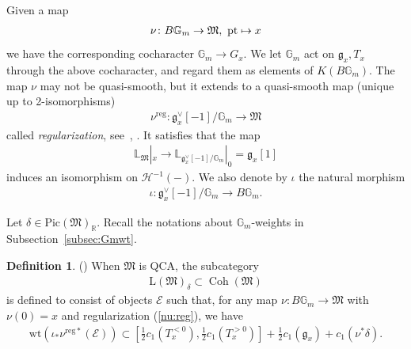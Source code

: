 \documentclass[11pt,oneside,a4paper,mathscr]{amsart}
\theoremstyle{definition}
\newtheorem{defn}[thm]{Definition}
\newcommand{\cH}{\mathcal{H}}
\newcommand{\cE}{\mathcal{E}}
\newcommand{\bgm}{B\mathbb{G}_m}
\newcommand{\Coh}{\operatorname{Coh}}
\newcommand{\wt}{\mathrm{wt}}
\begin{document}
Given a map 
\begin{align}\notag\nu \colon \bgm\to \mathfrak{M}, \ 
\mathrm{pt} \mapsto x
\end{align}
we have the corresponding cocharacter 
$\mathbb{G}_m \to G_x$. 
We let $\mathbb{G}_m$ act on $\mathfrak{g}_x, T_x$
through the above cocharacter, and regard them as elements of $K(\bgm)$. 
The map $\nu$ may not be quasi-smooth, but it extends to a quasi-smooth map
(unique up to 2-isomorphisms)
\begin{align}\label{nu:reg}
\nu^{\mathrm{reg}} \colon \mathfrak{g}_x^{\vee}[-1]/\mathbb{G}_m \to \mathfrak{M}
\end{align}
called \textit{regularization}, see~\cite[Construction~3.2.2]{HalpK32}, 
\cite[Construction-Definition~3.1]{PTlim}.
It satisfies that the map 
\begin{align*}
    \mathbb{L}_{\mathfrak{M}}|_{x} \to 
    \mathbb{L}_{\mathfrak{g}_x^{\vee}[-1]/\mathbb{G}_m}|_{0}=\mathfrak{g}_x[1]
\end{align*}
induces an isomorphism on $\cH^{-1}(-)$. 
We also denote by $\iota$ the natural 
morphism 
\begin{align*}
    \iota \colon \mathfrak{g}_x^{\vee}[-1]/\mathbb{G}_m \to 
    \bgm.
\end{align*}

Let $\delta \in \mathrm{Pic}(\mathfrak{M})_{\mathbb{R}}$. 
Recall the notations about $\mathbb{G}_m$-weights in Subsection~\ref{subsec:Gmwt}.
\begin{defn}\label{def:Lcat}(\cite[Definition~3.3]{PTlim})
When $\mathfrak{M}$ is QCA, the subcategory 
\begin{align}\label{def:L}
    \mathrm{L}(\mathfrak{M})_{\delta} \subset \Coh(\mathfrak{M})
\end{align}
is defined to consist of objects $\cE$ 
such that, for any map
$\nu \colon \bgm \to \mathfrak{M}$ 
with $\nu(0)=x$ and regularization (\ref{nu:reg}),
we have 
\begin{align}\label{wt:nu}
\wt(\iota_{\ast}\nu^{\mathrm{reg}\ast}(\cE))
\subset \left[\frac{1}{2} c_1 (T_x^{<0}),
\frac{1}{2} c_1 (T_x^{>0}) \right]+
\frac{1}{2}c_1(\mathfrak{g}_x)+c_1(\nu^*\delta).
\end{align}
\end{defn}
\end{document}
